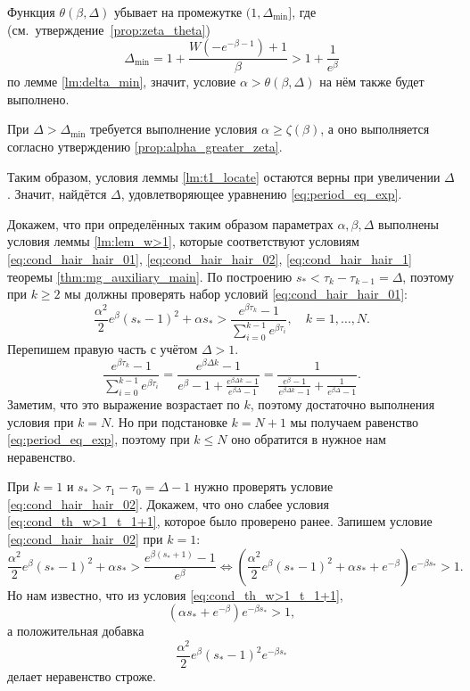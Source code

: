 Функция $\theta(\beta, \Delta)$ убывает на промежутке $(1, \Delta_{\text{min}}]$, где (см.~утверждение~\ref{prop:zeta_theta})
%
\[\Delta_{\text{min}} = 1 + \dfrac{W(-e^{-\beta - 1}) + 1}{\beta} > 1 + \dfrac{1}{e^{\beta}}\]
%
по лемме \ref{lm:delta_min}, значит, условие $\alpha > \theta(\beta, \Delta)$ на нём также будет выполнено. %

При $\Delta > \Delta_{\text{min}}$ требуется выполнение условия $\alpha \geqslant \zeta(\beta)$, а оно выполняется согласно утверждению \ref{prop:alpha_greater_zeta}.

Таким образом, условия леммы 
\ref{lm:t1_locate} остаются верны при увеличении $\Delta$. Значит, найдётся $\Delta$, удовлетворяющее уравнению \eqref{eq:period_eq_exp}.

Докажем, что при определённых таким образом параметрах $\alpha, \beta, \Delta$ выполнены условия леммы \ref{lm:lem_w>1}, которые соответствуют условиям \eqref{eq:cond_hair_hair_01}, \eqref{eq:cond_hair_hair_02}, \eqref{eq:cond_hair_hair_1} теоремы \ref{thm:mg_auxiliary_main}. По построению $s_* < \tau_k - \tau_{k - 1} = \Delta$, поэтому при $k \geqslant 2$ мы должны проверять набор условий \eqref{eq:cond_hair_hair_01}:
\[
\frac{\alpha^2}{2}e^\beta(s_*-1)^2+\alpha s_* > \frac{e^{\beta \tau_k}-1}{\sum_{i=0}^{k-1}e^{\beta \tau_i}},\quad k=1,\ldots,N.
\]
%
Перепишем правую часть с учётом $\Delta > 1$.
\[
\frac{e^{\beta \tau_k}-1}{\sum_{i=0}^{k-1}e^{\beta \tau_i}} = \frac{e^{\beta\Delta k } - 1}{e^{\beta} - 1 + \frac{e^{\beta\Delta k} - 1}{e^{\beta\Delta} - 1}} = \frac{1}{\frac{e^{\beta} - 1}{e^{\beta\Delta k} - 1} + \frac{1}{e^{\beta\Delta} - 1}}.
\]
%
Заметим, что это выражение возрастает по $k$, поэтому достаточно выполнения условия при $k = N$. Но при подстановке $k = N + 1$ мы получаем равенство \eqref{eq:period_eq_exp}, поэтому при $k \leqslant N$ оно обратится в нужное нам неравенство.

При $k = 1$ и $s_* > \tau_1 - \tau_0 = \Delta - 1$ нужно проверять условие \eqref{eq:cond_hair_hair_02}. Докажем, что оно слабее условия \eqref{eq:cond_th_w>1_t_1+1}, которое было проверено ранее. Запишем условие \eqref{eq:cond_hair_hair_02} при $k=1$:
\[
\frac{\alpha^2}{2} e^{\beta}(s_* - 1)^2 + \alpha s_* > \frac{e^{\beta (s_* + 1)} - 1}{e^{\beta}} \Leftrightarrow \left(\frac{\alpha^2}{2} e^{\beta}(s_* - 1)^2 + \alpha s_* + e^{-\beta}\right)e^{-\beta s_*} > 1.
\]
%
Но нам известно, что из условия \eqref{eq:cond_th_w>1_t_1+1},
\[
\left(\alpha s_* + e^{-\beta}\right)e^{-\beta s_*} > 1,
\]
%
а положительная добавка
\[\dfrac{\alpha^2}{2} e^{\beta}(s_* - 1)^2 e^{-\beta s_*}\]
делает неравенство строже.

